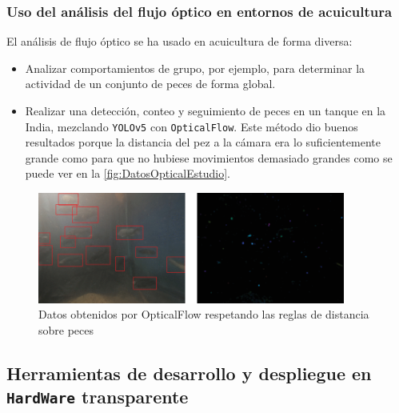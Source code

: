 \subsubsection{Uso del análisis del flujo óptico en entornos de acuicultura}

El análisis de flujo óptico se ha usado en acuicultura de forma diversa:

\begin{itemize}
    \item Analizar comportamientos de grupo, por ejemplo, para determinar la actividad de un conjunto de peces de forma global\cite{kobayashiAquaColonyFully2023}.
    \item Realizar una detección, conteo y seguimiento de peces en un tanque en la India, mezclando \texttt{YOLOv5} con \texttt{OpticalFlow}\cite{paiComputerVisionBased2022}. Este método dio buenos resultados porque 
    la distancia del pez a la cámara era lo suficientemente grande como para que no hubiese movimientos demasiado grandes como se puede ver en la \autoref{fig:DatosOpticalEstudio}.
\end{itemize}

\begin{figure}[H]
    \centering
    \includegraphics[width=0.9\textwidth]{images/4/OpticalFlowIndia.png}
    \caption{Datos obtenidos por OpticalFlow respetando las reglas de distancia sobre peces\cite{paiComputerVisionBased2022}}
    \label{fig:DatosOpticalEstudio}
\end{figure}
\clearpage


\subsection{Herramientas de desarrollo y despliegue en \texttt{HardWare} transparente}

